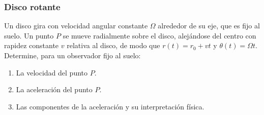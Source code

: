 \subsubsection{Disco rotante}
Un disco gira con velocidad angular constante $\Omega$ alrededor de su eje, que es fijo al
suelo. Un punto $P$ se mueve radialmente sobre el disco, alejándose del centro con rapidez
constante $v$ relativa al disco, de modo que $r(t) = r_0 + vt$ y $\theta(t) = \Omega t$.
Determine, para un observador fijo al suelo:
\begin{enumerate}
    \item La velocidad del punto $P$.
    \item La aceleración del punto $P$.
    \item Las componentes de la aceleración y su interpretación física.
\end{enumerate}

